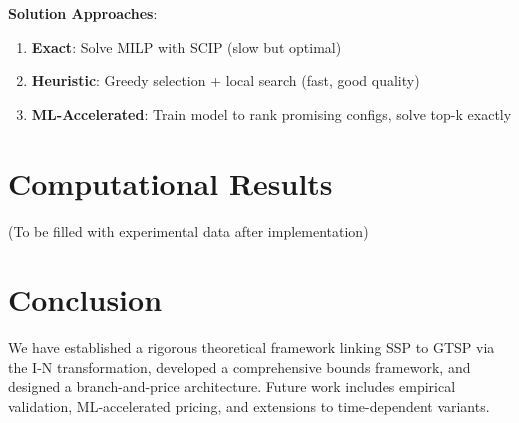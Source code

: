 \documentclass[12pt]{article}
\begin{document}
	\textbf{Solution Approaches}:
	\begin{enumerate}
		\item \textbf{Exact}: Solve MILP with SCIP (slow but optimal)
		\item \textbf{Heuristic}: Greedy selection + local search (fast, good quality)
		\item \textbf{ML-Accelerated}: Train model to rank promising configs, solve top-k exactly
	\end{enumerate}
	
	\section{Computational Results}
	
	(To be filled with experimental data after implementation)
	
	\section{Conclusion}
	
	We have established a rigorous theoretical framework linking SSP to GTSP via the I-N transformation, developed a comprehensive bounds framework, and designed a branch-and-price architecture. Future work includes empirical validation, ML-accelerated pricing, and extensions to time-dependent variants.
	
	\newpage
	
	
	
\end{document}
